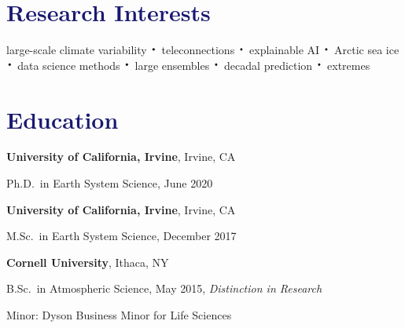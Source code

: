 \documentclass[margin,line,palatino,courier,10pt]{res}
\newcommand*{\LargerCdot}{\raisebox{-0.25ex}{\scalebox{2.1}{$\cdot$}}}
\newenvironment{list1}{
  \begin{list}{\ding{113}}{%
      \setlength{\itemsep}{0in}
      \setlength{\parsep}{0in} \setlength{\parskip}{0in}
      \setlength{\topsep}{0in} \setlength{\partopsep}{0in}
      \setlength{\leftmargin}{0.17in}}}{\end{list}}
\begin{document}
\begin{resume}
\section{\sc \textcolor{MidnightBlue}{\large{\textbf{Research Interests}}}}
large-scale climate variability $\LargerCdot$ teleconnections $\LargerCdot$ explainable AI $\LargerCdot$ Arctic sea ice $\LargerCdot$ data science methods $\LargerCdot$ large ensembles $\LargerCdot$ decadal prediction $\LargerCdot$ extremes

\vspace{-0.1in}
\noindent\textcolor{MidnightBlue}{\makebox[\linewidth][r]{\rule{\textwidth}{5pt}}}
\vspace{-0.3in}
\renewcommand{\arraystretch}{1.4}
\section{\sc \large{\textcolor{MidnightBlue}{\textbf{Education}}}}

{\bf University of California, Irvine}, Irvine, CA\\
\vspace*{-.12in}
\begin{list1}
\item[] Ph.D.~in Earth System Science, June 2020
\end{list1}

{\bf University of California, Irvine}, Irvine, CA\\
\vspace*{-.12in}
\begin{list1}
\item[] M.Sc.~in Earth System Science, December 2017
\end{list1}

{\bf Cornell University}, Ithaca, NY\\
\vspace*{-.12in}
\begin{list1}
\item[] B.Sc.~in Atmospheric Science, May 2015, \textit{Distinction in Research}

\hspace*{0.2in}  Minor: Dyson Business Minor for Life Sciences

\end{list1}


\end{resume}
\end{document}
